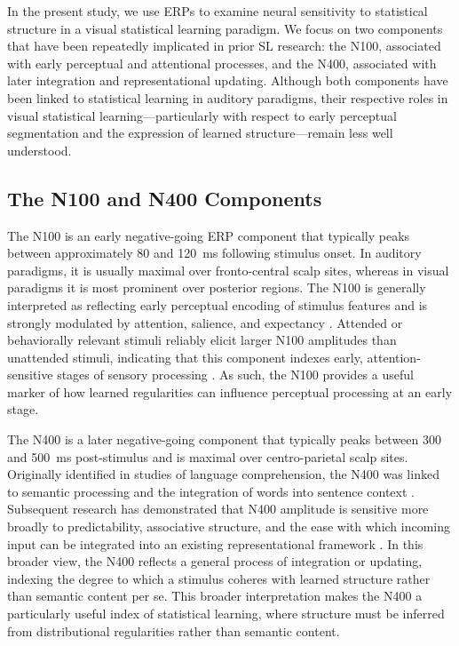 In the present study, we use ERPs to examine neural sensitivity to statistical structure in a visual statistical learning paradigm. We focus on two components that have been repeatedly implicated in prior SL research: the N100, associated with early perceptual and attentional processes, and the N400, associated with later integration and representational updating. Although both components have been linked to statistical learning in auditory paradigms, their respective roles in visual statistical learning—particularly with respect to early perceptual segmentation and the expression of learned structure—remain less well understood.

\subsection*{The N100 and N400 Components}

The N100 is an early negative-going ERP component that typically peaks between approximately 80 and 120~ms following stimulus onset. In auditory paradigms, it is usually maximal over fronto-central scalp sites, whereas in visual paradigms it is most prominent over posterior regions. The N100 is generally interpreted as reflecting early perceptual encoding of stimulus features and is strongly modulated by attention, salience, and expectancy \cite{luckIntroductionEventRelatedPotential2014, hillyardEventrelatedBrainPotentials1998}. Attended or behaviorally relevant stimuli reliably elicit larger N100 amplitudes than unattended stimuli, indicating that this component indexes early, attention-sensitive stages of sensory processing \cite{hillyardEventrelatedBrainPotentials1998, correaAttentionalMechanismTemporal2006}. As such, the N100 provides a useful marker of how learned regularities can influence perceptual processing at an early stage.

The N400 is a later negative-going component that typically peaks between 300 and 500~ms post-stimulus and is maximal over centro-parietal scalp sites. Originally identified in studies of language comprehension, the N400 was linked to semantic processing and the integration of words into sentence context \cite{kutasReadingSenselessSentences1980}. Subsequent research has demonstrated that N400 amplitude is sensitive more broadly to predictability, associative structure, and the ease with which incoming input can be integrated into an existing representational framework \cite{kutasThirtyYearsCounting2011}. In this broader view, the N400 reflects a general process of integration or updating, indexing the degree to which a stimulus coheres with learned structure rather than semantic content per se. This broader interpretation makes the N400 a particularly useful index of statistical learning, where structure must be inferred from distributional regularities rather than semantic content.


